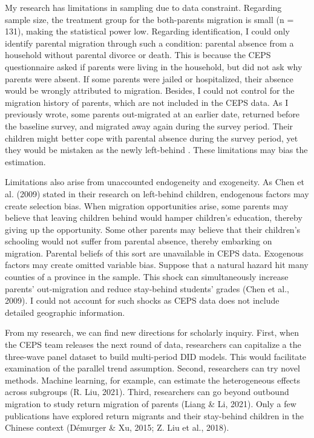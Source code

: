 \documentclass[
  man,floatsintext]{apa7}
\begin{document}
My research has limitations in sampling due to data constraint. Regarding sample size, the treatment group for the both-parents migration is small (n = 131), making the statistical power low. Regarding identification, I could only identify parental migration through such a condition: parental absence from a household without parental divorce or death. This is because the CEPS questionnaire asked if parents were living in the household, but did not ask why parents were absent. If some parents were jailed or hospitalized, their absence would be wrongly attributed to migration. Besides, I could not control for the migration history of parents, which are not included in the CEPS data. As I previously wrote, some parents out-migrated at an earlier date, returned before the baseline survey, and migrated away again during the survey period. Their children might better cope with parental absence during the survey period, yet they would be mistaken as the newly left-behind . These limitations may bias the estimation.

Limitations also arise from unaccounted endogeneity and exogeneity. As Chen et al. (2009) stated in their research on left-behind children, endogenous factors may create selection bias. When migration opportunities arise, some parents may believe that leaving children behind would hamper children's education, thereby giving up the opportunity. Some other parents may believe that their children's schooling would not suffer from parental absence, thereby embarking on migration. Parental beliefs of this sort are unavailable in CEPS data. Exogenous factors may create omitted variable bias. Suppose that a natural hazard hit many counties of a province in the sample. This shock can simultaneously increase parents' out-migration and reduce stay-behind students' grades (Chen et al., 2009). I could not account for such shocks as CEPS data does not include detailed geographic information.

From my research, we can find new directions for scholarly inquiry. First, when the CEPS team releases the next round of data, researchers can capitalize a the three-wave panel dataset to build multi-period DID models. This would facilitate examination of the parallel trend assumption. Second, researchers can try novel methods. Machine learning, for example, can estimate the heterogeneous effects across subgroups (R. Liu, 2021). Third, researchers can go beyond outbound migration to study return migration of parents (Liang \& Li, 2021). Only a few publications have explored return migrants and their stay-behind children in the Chinese context (Démurger \& Xu, 2015; Z. Liu et al., 2018).
\end{document}

